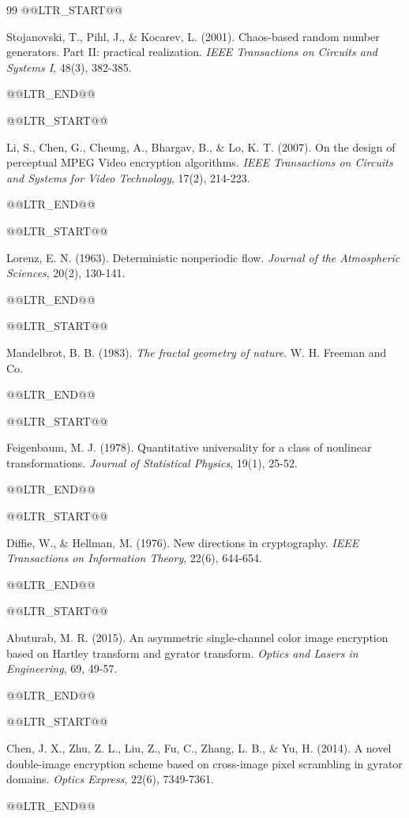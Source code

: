 \begin{thebibliography}{99}
@@LTR_START@@

 Stojanovski, T., Pihl, J., \& Kocarev, L. (2001). Chaos-based random number generators. Part II: practical realization. \textit{IEEE Transactions on Circuits and Systems I}, 48(3), 382-385.

@@LTR_END@@

@@LTR_START@@

 Li, S., Chen, G., Cheung, A., Bhargav, B., \& Lo, K. T. (2007). On the design of perceptual MPEG Video encryption algorithms. \textit{IEEE Transactions on Circuits and Systems for Video Technology}, 17(2), 214-223.

@@LTR_END@@

@@LTR_START@@

 Lorenz, E. N. (1963). Deterministic nonperiodic flow. \textit{Journal of the Atmospheric Sciences}, 20(2), 130-141.

@@LTR_END@@

@@LTR_START@@

 Mandelbrot, B. B. (1983). \textit{The fractal geometry of nature}. W. H. Freeman and Co.

@@LTR_END@@

@@LTR_START@@

 Feigenbaum, M. J. (1978). Quantitative universality for a class of nonlinear transformations. \textit{Journal of Statistical Physics}, 19(1), 25-52.

@@LTR_END@@

@@LTR_START@@

 Diffie, W., \& Hellman, M. (1976). New directions in cryptography. \textit{IEEE Transactions on Information Theory}, 22(6), 644-654.

@@LTR_END@@

@@LTR_START@@

 Abuturab, M. R. (2015). An asymmetric single-channel color image encryption based on Hartley transform and gyrator transform. \textit{Optics and Lasers in Engineering}, 69, 49-57.

@@LTR_END@@

@@LTR_START@@

 Chen, J. X., Zhu, Z. L., Liu, Z., Fu, C., Zhang, L. B., \& Yu, H. (2014). A novel double-image encryption scheme based on cross-image pixel scrambling in gyrator domains. \textit{Optics Express}, 22(6), 7349-7361.

@@LTR_END@@


\end{thebibliography}
